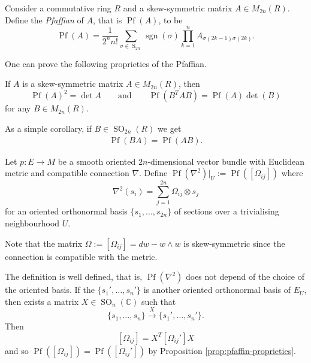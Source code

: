 \documentclass[a4paper,openany]{scrbook}
\begin{document}

\begin{defn}
    Consider a commutative ring $R$ and a skew-symmetric matrix $A \in M_{2n}(R)$. Define the \textit{Pfaffian} of $A$, that is $\operatorname{Pf}(A)$, to be
    $$\operatorname{Pf}(A) = \frac{1}{2^n n!} \sum_{\sigma \in \operatorname{S}_{2n}} \operatorname{sgn}(\sigma) \prod_{k=1}^n A_{\sigma(2k-1) \sigma(2k)}.$$
\end{defn}

One can prove the following proprieties of the Pfaffian.

\begin{prop}
\label{prop:pfaffin-proprieties}
    If $A$ is a skew-symmetric matrix $A \in M_{2n}(R)$, then
    $$\operatorname{Pf}(A)^2 = \det{A} \qquad \text{and} \qquad \operatorname{Pf}(B^TAB) = \operatorname{Pf}(A)\det(B)$$
    for any $B \in M_{2n}(R)$.
\end{prop}

As a simple corollary, if $B \in \operatorname{SO}_{2n}(R)$ we get
\begin{align}
    \label{remark:pfaffian-commutative-so}
    \operatorname{Pf}(BA)=\operatorname{Pf}(AB).
\end{align}

\begin{defn}
    Let $p:E \rightarrow M$ be a smooth oriented $2n$-dimensional vector bundle with Euclidean metric and compatible connection $\nabla$. Define $\operatorname{Pf}(\nabla^2)|_U := \operatorname{Pf}([\Omega_{ij}])$ where
    $$\nabla^2(s_i) = \sum_{j=1}^{2n} {\Omega_{ij}} \otimes s_j$$
    for an oriented orthonormal basis $\{s_1,\dots,s_{2n}\}$ of sections over a trivialising neighbourhood $U$.
\end{defn}

\begin{remark}
    Note that the matrix $\Omega:=[\Omega_{ij}] = dw-w\wedge w$ is skew-symmetric since the connection is compatible with the metric.
\end{remark}

\begin{remark}
    The definition is well defined, that is, $\operatorname{Pf}(\nabla^2)$ does not depend of the choice of the oriented basis. If the $\{s_1',\dots, s_n'\}$ is another oriented orthonormal basis of $E_U$, then exists a matrix $X \in \operatorname{SO}_n(\mathbb{C})$ such that
    $$\{s_1,\dots,s_n\} \xrightarrow{X} \{s_1',\dots, s_n'\}.$$
    Then 
    $$[\Omega_{ij}] = X^T[\Omega_{ij}']X$$
    and so $\operatorname{Pf}([\Omega_{ij}]) = \operatorname{Pf}([\Omega_{ij}'])$ by Proposition \ref{prop:pfaffin-proprieties}.
\end{remark}
\end{document}
